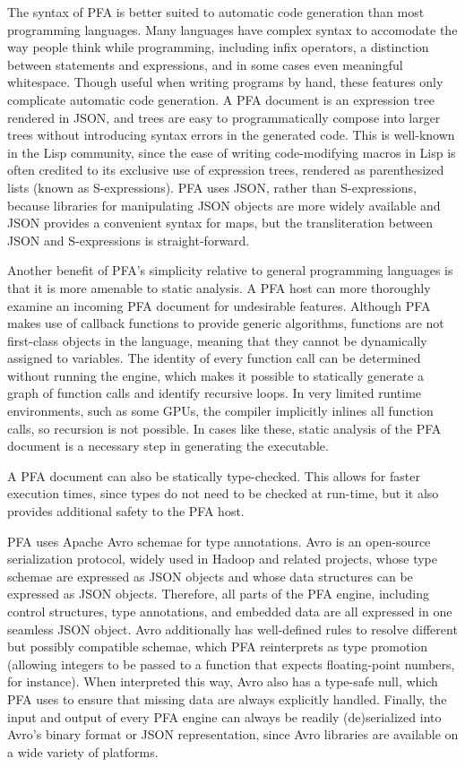 \documentclass{article}
\theoremstyle{definition}
\begin{document}
The syntax of PFA is better suited to automatic code generation than most programming languages.  Many languages have complex syntax to accomodate the way people think while programming, including infix operators, a distinction between statements and expressions, and in some cases even meaningful whitespace.  Though useful when writing programs by hand, these features only complicate automatic code generation.  A PFA document is an expression tree rendered in JSON, and trees are easy to programmatically compose into larger trees without introducing syntax errors in the generated code.  This is well-known in the Lisp community, since the ease of writing code-modifying macros in Lisp is often credited to its exclusive use of expression trees, rendered as parenthesized lists (known as S-expressions).  PFA uses JSON, rather than S-expressions, because libraries for manipulating JSON objects are more widely available and JSON provides a convenient syntax for maps, but the transliteration between JSON and S-expressions is straight-forward.

Another benefit of PFA's simplicity relative to general programming languages is that it is more amenable to static analysis.  A PFA host can more thoroughly examine an incoming PFA document for undesirable features.  Although PFA makes use of callback functions to provide generic algorithms, functions are not first-class objects in the language, meaning that they cannot be dynamically assigned to variables.  The identity of every function call can be determined without running the engine, which makes it possible to statically generate a graph of function calls and identify recursive loops.  In very limited runtime environments, such as some GPUs, the compiler implicitly inlines all function calls, so recursion is not possible.  In cases like these, static analysis of the PFA document is a necessary step in generating the executable.

A PFA document can also be statically type-checked.  This allows for faster execution times, since types do not need to be checked at run-time, but it also provides additional safety to the PFA host.

PFA uses Apache Avro schemae for type annotations.  Avro is an open-source serialization protocol, widely used in Hadoop and related projects, whose type schemae are expressed as JSON objects and whose data structures can be expressed as JSON objects.  Therefore, all parts of the PFA engine, including control structures, type annotations, and embedded data are all expressed in one seamless JSON object.  Avro additionally has well-defined rules to resolve different but possibly compatible schemae, which PFA reinterprets as type promotion (allowing integers to be passed to a function that expects floating-point numbers, for instance).  When interpreted this way, Avro also has a type-safe null, which PFA uses to ensure that missing data are always explicitly handled.  Finally, the input and output of every PFA engine can always be readily (de)serialized into Avro's binary format or JSON representation, since Avro libraries are available on a wide variety of platforms.
\end{document}

